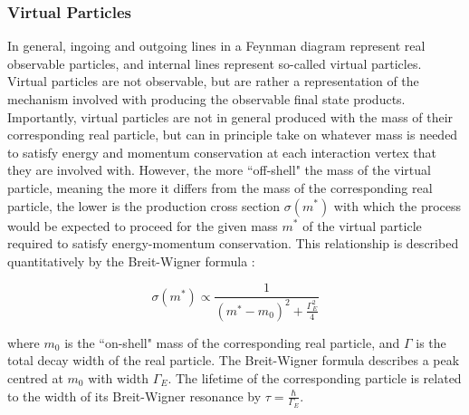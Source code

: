 \subsubsection{Virtual Particles}
\label{sec:virtual_particles}

In general, ingoing and outgoing lines in a Feynman diagram represent real observable particles, and internal lines represent so-called virtual particles. Virtual particles are not observable, but are rather a representation of the mechanism involved with producing the observable final state products. Importantly, virtual particles are not in general produced with the mass of their corresponding real particle, but can in principle take on whatever mass is needed to satisfy energy and momentum conservation at each interaction vertex that they are involved with. However, the more ``off-shell" the mass of the virtual particle, meaning the more it differs from the mass of the corresponding real particle, the lower is the production cross section \(\sigma(m^{*})\) with which the process would be expected to proceed for the given mass \(m^{*}\) of the virtual particle required to satisfy energy-momentum conservation. This relationship is described quantitatively by the Breit-Wigner formula \cite{breit_wigner}:

\begin{equation}
\label{eq:breit_wigner}
\sigma(m^{*}) \propto \frac{1}{(m^{*}-m_0)^2 + \frac{\Gamma_E^2}{4}}
\end{equation}

\noindent where \(m_0\) is the ``on-shell" mass of the corresponding real particle, and \(\Gamma\) is the total decay width of the real particle. The Breit-Wigner formula describes a peak centred at \(m_0\) with width \(\Gamma_E\). The lifetime of the corresponding particle is related to the width of its Breit-Wigner resonance by \(\tau = \frac{\hbar}{\Gamma_E}\).

